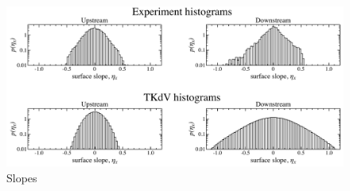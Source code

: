 \documentclass[11pt]{article}
\newcommand{\vsp}[1]{\vspace{#1 pc} \noindent}
\begin{document}
\begin{figure}%
\begin{center}
\includegraphics[width = 0.99 \linewidth]{Figs/slopehist.pdf}
\caption{
Slopes
}
\label{slopehist}
\end{center}
\end{figure}


\vsp{5}
\end{document}
